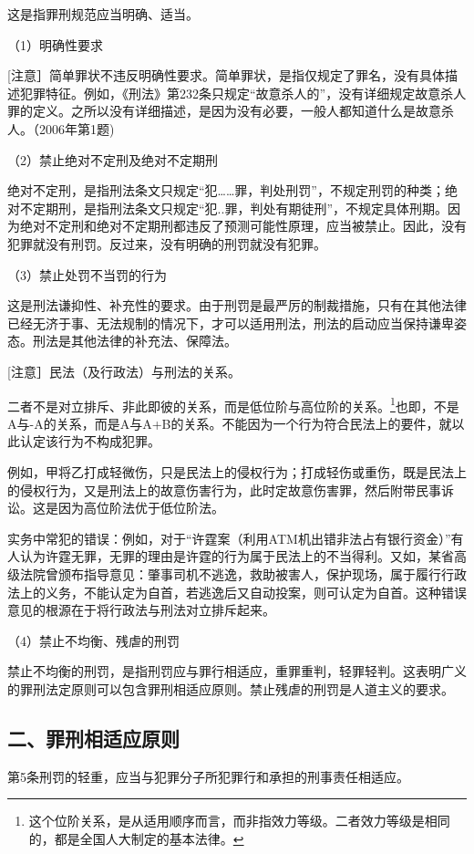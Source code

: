 这是指罪刑规范应当明确、适当。

（1）明确性要求

[注意］简单罪状不违反明确性要求。简单罪状，是指仅规定了罪名，没有具体描述犯罪特征。例如，《刑法》第232条只规定“故意杀人的”，没有详细规定故意杀人罪的定义。之所以没有详细描述，是因为没有必要，一般人都知道什么是故意杀人。（2006年第1题)

（2）禁止绝对不定刑及绝对不定期刑

绝对不定刑，是指刑法条文只规定“犯……罪，判处刑罚”，不规定刑罚的种类；绝对不定期刑，是指刑法条文只规定“犯..罪，判处有期徒刑”，不规定具体刑期。因为绝对不定刑和绝对不定期刑都违反了预测可能性原理，应当被禁止。因此，没有犯罪就没有刑罚。反过来，没有明确的刑罚就没有犯罪。

（3）禁止处罚不当罚的行为

这是刑法谦抑性、补充性的要求。由于刑罚是最严厉的制裁措施，只有在其他法律已经无济于事、无法规制的情况下，才可以适用刑法，刑法的启动应当保持谦卑姿态。刑法是其他法律的补充法、保障法。

[注意］民法（及行政法）与刑法的关系。

二者不是对立排斥、非此即彼的关系，而是低位阶与高位阶的关系。\footnote{这个位阶关系，是从适用顺序而言，而非指效力等级。二者效力等级是相同的，都是全国人大制定的基本法律。}也即，不是A与-A的关系，而是A与A+B的关系。不能因为一个行为符合民法上的要件，就以此认定该行为不构成犯罪。

例如，甲将乙打成轻微伤，只是民法上的侵权行为；打成轻伤或重伤，既是民法上的侵权行为，又是刑法上的故意伤害行为，此时定故意伤害罪，然后附带民事诉讼。这是因为高位阶法优于低位阶法。

实务中常犯的错误：例如，对于“许霆案（利用ATM机出错非法占有银行资金）”有人认为许霆无罪，无罪的理由是许霆的行为属于民法上的不当得利。又如，某省高级法院曾颁布指导意见：肇事司机不逃逸，救助被害人，保护现场，属于履行行政法上的义务，不能认定为自首，若逃逸后又自动投案，则可认定为自首。这种错误意见的根源在于将行政法与刑法对立排斥起来。

（4）禁止不均衡、残虐的刑罚

禁止不均衡的刑罚，是指刑罚应与罪行相适应，重罪重判，轻罪轻判。这表明广义的罪刑法定原则可以包含罪刑相适应原则。禁止残虐的刑罚是人道主义的要求。

\subsection*{二、罪刑相适应原则}

第5条刑罚的轻重，应当与犯罪分子所犯罪行和承担的刑事责任相适应。

